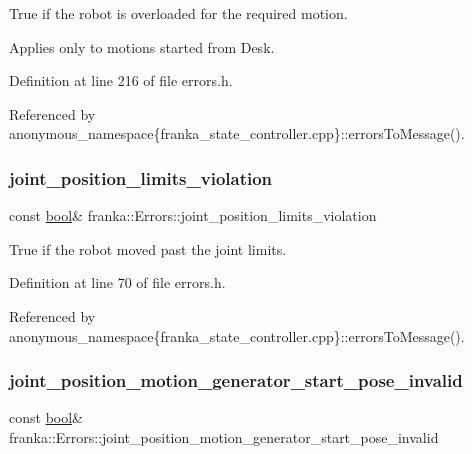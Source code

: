 True if the robot is overloaded for the required motion.

Applies only to motions started from Desk. 

Definition at line 216 of file errors.\+h.



Referenced by anonymous\+\_\+namespace\{franka\+\_\+state\+\_\+controller.\+cpp\}\+::errors\+To\+Message().

\mbox{\label{structfranka_1_1Errors_a44ba0d45e52639280d32cf447f967e29}} 
\subsubsection{\texorpdfstring{joint\+\_\+position\+\_\+limits\+\_\+violation}{joint\_position\_limits\_violation}}
{\footnotesize\ttfamily const \hyperlink{classbool}{bool}\& franka\+::\+Errors\+::joint\+\_\+position\+\_\+limits\+\_\+violation}

True if the robot moved past the joint limits. 

Definition at line 70 of file errors.\+h.



Referenced by anonymous\+\_\+namespace\{franka\+\_\+state\+\_\+controller.\+cpp\}\+::errors\+To\+Message().

\mbox{\label{structfranka_1_1Errors_a7af91cbf61dc79304bff3ffadc51ea86}} 
\subsubsection{\texorpdfstring{joint\+\_\+position\+\_\+motion\+\_\+generator\+\_\+start\+\_\+pose\+\_\+invalid}{joint\_position\_motion\_generator\_start\_pose\_invalid}}
{\footnotesize\ttfamily const \hyperlink{classbool}{bool}\& franka\+::\+Errors\+::joint\+\_\+position\+\_\+motion\+\_\+generator\+\_\+start\+\_\+pose\+\_\+invalid}


